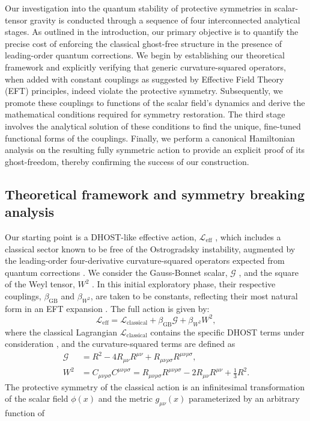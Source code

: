 \documentclass[twocolumn]{aastex631}
\begin{document}
Our investigation into the quantum stability of protective symmetries in scalar-tensor gravity is conducted through a sequence of four interconnected analytical stages. As outlined in the introduction, our primary objective is to quantify the precise cost of enforcing the classical ghost-free structure in the presence of leading-order quantum corrections. We begin by establishing our theoretical framework and explicitly verifying that generic curvature-squared operators, when added with constant couplings as suggested by Effective Field Theory (EFT) principles, indeed violate the protective symmetry. Subsequently, we promote these couplings to functions of the scalar field's dynamics and derive the mathematical conditions required for symmetry restoration. The third stage involves the analytical solution of these conditions to find the unique, fine-tuned functional forms of the couplings. Finally, we perform a canonical Hamiltonian analysis on the resulting fully symmetric action to provide an explicit proof of its ghost-freedom, thereby confirming the success of our construction.\subsection{Theoretical framework and symmetry breaking analysis}Our starting point is a DHOST-like effective action, $\mathcal{L}_{\text{eff}}$ \citep{achour2020rotatingblackholesdhost}, which includes a classical sector known to be free of the Ostrogradsky instability, augmented by the leading-order four-derivative curvature-squared operators expected from quantum corrections \citep{eichhorn2025purelymetrichorndeskitheories,eichhorn2025purelymetrichorndeskitheories}. We consider the Gauss-Bonnet scalar, $\mathcal{G}$ \citep{eichhorn2025purelymetrichorndeskitheories}, and the square of the Weyl tensor, $W^2$ \citep{cheung2017positivitycurvaturesquaredcorrectionsgravity}. In this initial exploratory phase, their respective couplings, $\beta_{\text{GB}}$ and $\beta_{W^2}$, are taken to be constants, reflecting their most natural form in an EFT expansion \citep{cheung2017positivitycurvaturesquaredcorrectionsgravity,calmet2017gravitationaleffectiveactionsecond}. The full action is given by:\begin{equation}\mathcal{L}_{\text{eff}} = \mathcal{L}_{\text{classical}} + \beta_{\text{GB}} \mathcal{G} + \beta_{W^2} W^2,\end{equation}where the classical Lagrangian $\mathcal{L}_{\text{classical}}$ contains the specific DHOST terms under consideration \citep{ilyas2020dhostbounce,colléaux2024classificationgeneralisedhigherordereinsteinmaxwell}, and the curvature-squared terms are defined as\begin{align}\mathcal{G} &= R^2 - 4 R_{\mu\nu}R^{\mu\nu} + R_{\mu\nu\rho\sigma}R^{\mu\nu\rho\sigma}, \\W^2 &= C_{\mu\nu\rho\sigma}C^{\mu\nu\rho\sigma} = R_{\mu\nu\rho\sigma}R^{\mu\nu\rho\sigma} - 2 R_{\mu\nu}R^{\mu\nu} + \frac{1}{3}R^2.\end{align}The protective symmetry of the classical action is an infinitesimal transformation of the scalar field $\phi(x)$ and the metric $g_{\mu\nu}(x)$ parameterized by an arbitrary function of 
\end{document}
